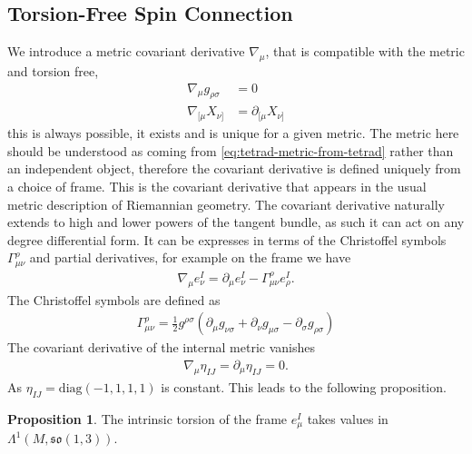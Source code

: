 \documentclass[10pt]{report}
\theoremstyle{definition}
\newtheorem{proposition}{Proposition}[chapter]
\begin{document}
\subsection{Torsion-Free Spin Connection}
We introduce a metric covariant derivative $\nabla_\mu$, that is compatible with the metric and torsion free,
\begin{align}
    \nabla_\mu g_{\rho \sigma} & = 0 \\
    \nabla_{[\mu} X_{\nu]} & = \partial_{[\mu} X_{\nu]}
\end{align}
this is always possible, it exists and is unique for a given metric. The metric here should be understood as coming from \cref{eq:tetrad-metric-from-tetrad} rather than an independent object, therefore the covariant derivative is defined uniquely from a choice of frame. This is the covariant derivative that appears in the usual metric description of Riemannian geometry. The covariant derivative naturally extends to high and lower powers of the tangent bundle, as such it can act on any degree differential form. It can be expresses in terms of the Christoffel symbols $\Gamma^\rho_{\mu\nu}$ and partial derivatives, for example on the frame we have
\begin{align}
    \nabla_\mu e^I_\nu = \partial_\mu e^I_\nu - \Gamma^\rho_{\mu\nu} e^I_\rho.
\end{align}
The Christoffel symbols are defined as 
\begin{align}
    \Gamma^\rho_{\mu\nu} = \frac{1}{2} g^{\rho\sigma} \left( \partial_\mu g_{\nu\sigma} + \partial_\nu g_{\mu\sigma} - \partial_\sigma g_{\rho\sigma} \right) \label{eq:so13-metric-christoffel-symbol-definition}
\end{align}
The covariant derivative of the internal metric vanishes
\begin{align}
    \nabla_\mu \eta_{IJ} = \partial_\mu \eta_{IJ} = 0.
\end{align}
As $\eta_{IJ} = \textrm{diag}(-1,1,1,1)$ is constant. This leads to the following proposition.
\begin{proposition}
    The intrinsic torsion of the frame $e^I_\mu$ takes values in $\Lambda^1(M,\mathfrak{so}(1,3))$.
\end{proposition}
\end{document}
